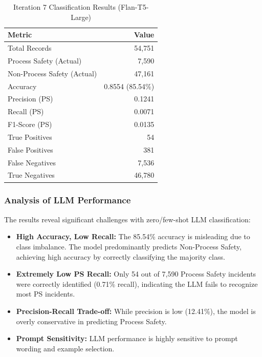 \documentclass[11pt, titlepage, bibliography=totoc]{scrreprt}
\begin{document}
\begin{table}[htbp]
\centering
\caption{Iteration 7 Classification Results (Flan-T5-Large)}
\label{tab:iter7-results}
\begin{tabular}{@{}lr@{}}
\toprule
\textbf{Metric} & \textbf{Value} \\
\midrule
Total Records & 54,751 \\
Process Safety (Actual) & 7,590 \\
Non-Process Safety (Actual) & 47,161 \\
\midrule
Accuracy & 0.8554 (85.54\%) \\
Precision (PS) & 0.1241 \\
Recall (PS) & 0.0071 \\
F1-Score (PS) & 0.0135 \\
\midrule
True Positives & 54 \\
False Positives & 381 \\
False Negatives & 7,536 \\
True Negatives & 46,780 \\
\bottomrule
\end{tabular}
\end{table}

\subsubsection{Analysis of LLM Performance}

The results reveal significant challenges with zero/few-shot LLM classification:

\begin{itemize}
    \item \textbf{High Accuracy, Low Recall:} The 85.54\% accuracy is misleading due to class imbalance. The model predominantly predicts Non-Process Safety, achieving high accuracy by correctly classifying the majority class.
    
    \item \textbf{Extremely Low PS Recall:} Only 54 out of 7,590 Process Safety incidents were correctly identified (0.71\% recall), indicating the LLM fails to recognize most PS incidents.
    
    \item \textbf{Precision-Recall Trade-off:} While precision is low (12.41\%), the model is overly conservative in predicting Process Safety.
    
    \item \textbf{Prompt Sensitivity:} LLM performance is highly sensitive to prompt wording and example selection.
\end{itemize}
\end{document}
